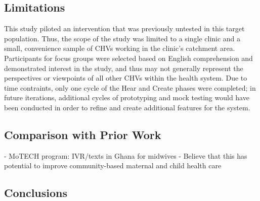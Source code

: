 \subsection{Limitations}
This study piloted an intervention that was previously untested in this target population. Thus, the scope of the study was limited to a single clinic and a small, convenience sample of CHVs working in the clinic's catchment area. Participants for focus groups were selected based on English comprehension and demonstrated interest in the study, and thus may not generally represent the perspectives or viewpoints of all other CHVs within the health system. Due to time contraints, only one cycle of the Hear and Create phases were completed; in future iterations, additional cycles of prototyping and mock testing would have been conducted in order to refine and create additional features for the system.  

\subsection{Comparison with Prior Work}

- MoTECH program: IVR/texts in Ghana for midwives
- Believe that this has potential to improve community-based maternal and child health care

\subsection{Conclusions}